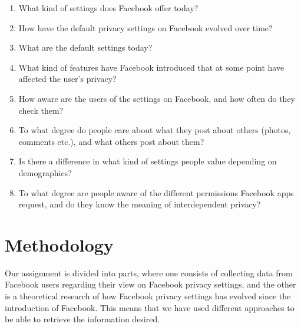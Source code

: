 \begin{enumerate}
\item What kind of settings does Facebook offer today?
\item How have the default privacy settings on Facebook evolved over time?
\item What are the default settings today?
\item What kind of features have Facebook introduced that at some point have affected the user's privacy?
\item How aware are the users of the settings on Facebook, and how often do they check them?
\item To what degree do people care about what they post about others (photos, comments etc.), and what others post about them? 
\item Is there a difference in what kind of settings people value depending on  demographics?
\item To what degree are people aware of the different permissions Facebook apps request, and do they know the meaning of interdependent privacy?
\end{enumerate}



\section{Methodology}
\label{sec:methodology}
Our assignment is divided into parts, where one consists of collecting data from Facebook users regarding their view on Facebook privacy settings, and the other is a theoretical research of how Facebook privacy settings has evolved since the introduction of Facebook. This means that we have used different approaches to be able to retrieve the information desired.

